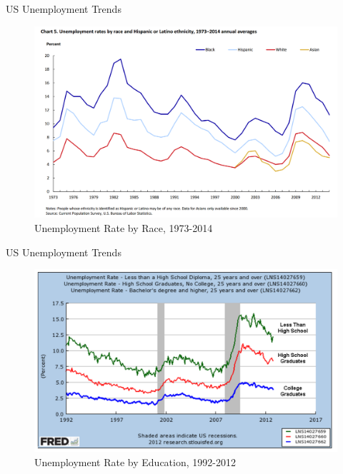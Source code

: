 \documentclass[xcolor={dvipsnames},pdf, hyperref={colorlinks=true, citecolor=ForestGreen, linkcolor=BlueViolet, urlcolor=Magenta}]{beamer}
\theoremstyle{definition}
\begin{document}
\begin{frame}{US Unemployment Trends}
	\begin{figure}
		\centering
		\includegraphics[scale=.5]{01C_1.png}
		\caption{Unemployment Rate by Race, 1973-2014}
	\end{figure}
\end{frame}

\begin{frame}{US Unemployment Trends}
	\begin{figure}
		\centering
		\includegraphics[scale=.4]{01C_2.png}
		\caption{Unemployment Rate by Education, 1992-2012}
	\end{figure}
\end{frame}
\end{document}
